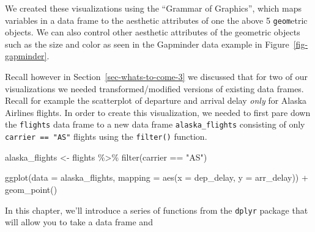 \documentclass[
  letterpaper,
  DIV=11,
  numbers=noendperiod]{scrreprt}
\newenvironment{Shaded}{\begin{snugshade}}{\end{snugshade}}
\newcommand{\AttributeTok}[1]{\textcolor[rgb]{0.40,0.45,0.13}{#1}}
\newcommand{\FunctionTok}[1]{\textcolor[rgb]{0.28,0.35,0.67}{#1}}
\newcommand{\NormalTok}[1]{\textcolor[rgb]{0.00,0.23,0.31}{#1}}
\newcommand{\OtherTok}[1]{\textcolor[rgb]{0.00,0.23,0.31}{#1}}
\newcommand{\SpecialCharTok}[1]{\textcolor[rgb]{0.37,0.37,0.37}{#1}}
\newcommand{\StringTok}[1]{\textcolor[rgb]{0.13,0.47,0.30}{#1}}
\theoremstyle{definition}
\theoremstyle{remark}
\begin{document}
We created these visualizations using the ``Grammar of Graphics'', which
maps variables in a data frame to the aesthetic attributes of one the
above 5 \texttt{geom}etric objects. We can also control other aesthetic
attributes of the geometric objects such as the size and color as seen
in the Gapminder data example in Figure~\ref{fig-gapminder}.

Recall however in Section~\ref{sec-whats-to-come-3} we discussed that
for two of our visualizations we needed transformed/modified versions of
existing data frames. Recall for example the scatterplot of departure
and arrival delay \emph{only} for Alaska Airlines flights. In order to
create this visualization, we needed to first pare down the
\texttt{flights} data frame to a new data frame \texttt{alaska\_flights}
consisting of only \texttt{carrier\ ==\ "AS"} flights using the
\texttt{filter()} function.

\begin{Shaded}
\begin{Highlighting}[]
\NormalTok{alaska\_flights }\OtherTok{\textless{}{-}}\NormalTok{ flights }\SpecialCharTok{\%\textgreater{}\%} 
  \FunctionTok{filter}\NormalTok{(carrier }\SpecialCharTok{==} \StringTok{"AS"}\NormalTok{)}

\FunctionTok{ggplot}\NormalTok{(}\AttributeTok{data =}\NormalTok{ alaska\_flights, }\AttributeTok{mapping =} \FunctionTok{aes}\NormalTok{(}\AttributeTok{x =}\NormalTok{ dep\_delay, }\AttributeTok{y =}\NormalTok{ arr\_delay)) }\SpecialCharTok{+} 
  \FunctionTok{geom\_point}\NormalTok{()}
\end{Highlighting}
\end{Shaded}

In this chapter, we'll introduce a series of functions from the
\texttt{dplyr} package that will allow you to take a data frame and
\end{document}
